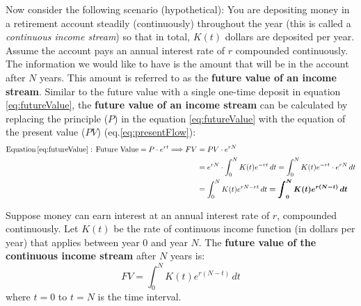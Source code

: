 \noindent Now consider the following scenario (hypothetical):  You are depositing money in a retirement account steadily (continuously) throughout the year (this is called a \emph{continuous income stream}) so that in total, $K(t)$ dollars are deposited per year.  Assume the account pays an annual interest rate of $r$ compounded continuously.  The information we would like to have is the amount that will be in the account after $N$ years.  This amount is referred to as the \textbf{future value of an income stream}. Similar to the future value with a single one-time deposit in equation \ref{eq:futureValue}, the \textbf{future value of an income stream} can be calculated by replacing the principle ($P$) in the equation \ref{eq:futureValue} with the equation of the present value ($PV$) (eq.\ref{eq:presentFlow}):
\begin{displaymath}
        \begin{split}
         \text{Equation}\,\ref{eq:futureValue}:\, \text{Future Value}=P\cdot e^{rt}\Longrightarrow   FV&=PV\cdot e^{rN}\\
            &=e^{rN}\cdot \int_0^N K(t)e^{-rt}\,dt=\int_0^N K(t)e^{-rt}\cdot e^{rN} \,dt\\
            &=\int_0^N K(t)e^{rN-rt} \,dt\bm{=\int_0^N K(t)e^{r(N-t)} \,dt}\\
    \end{split}
\end{displaymath}
\begin{tcolorbox}[title = {Future Value of Income Stream}]
Suppose money can earn interest at an annual interest rate of $r$, compounded continuously. Let $K(t)$ be the rate of continuous income function (in dollars per year) that applies between year 0 and year $N$. The \textbf{future value of the continuous income stream} after $N$ years is:
\begin{equation}
    FV=\int_0^N K(t)e^{r(N-t)} \,dt
\end{equation}
\noindent where $t=0$ to $t=N$ is the time interval.
\end{tcolorbox}

